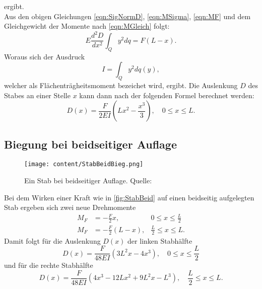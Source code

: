 ergibt. \\
Aus den obigen Gleichungen \eqref{eqn:SigNormD}, \eqref{eqn:MSigma}, \eqref{eqn:MF} und dem Gleichgewicht der Momente nach \eqref{eqn:MGleich} folgt:
\begin{equation}
    E\frac{d^2D}{dx^2} \int_Q y^2dq = F(L-x).
\end{equation}
Woraus sich der Ausdruck
\begin{equation}
    I = \int_Q y^2dq(y),
\end{equation}
welcher als Flächenträgheitsmoment bezeichet wird, ergibt.
Die Auslenkung $D$ des Stabes an einer Stelle $x$ kann dann nach der folgenden Formel berechnet werden:
\begin{equation}
    \label{eqn:DvonX}
    D\left(x\right) = \frac{F}{2EI}\left(Lx^2-\frac{x^3}{3}\right),\quad 0\leq x \leq L.
\end{equation}
\subsection{Biegung bei beidseitiger Auflage}
\label{subsec:BeidseitigeAuflage}
\begin{figure}[H]
    \centering
    \texttt{[image: content/StabBeidBieg.png]}
    \caption{Ein Stab bei beidseitiger Auflage. Quelle: \cite{sample}}  %
    \label{fig:StabBeid}
\end{figure}
Bei dem Wirken einer Kraft wie in \autoref{fig:StabBeid} auf einen beidseitig aufgelegten Stab ergeben sich zwei neue Drehmomente
\begin{align}
    M_F &= -\frac{F}{2}x, &0 \leq x \leq \frac{L}{2}\\
    M_F &= -\frac{F}{2}(L-x), &\frac{L}{2} \leq x \leq L.
\end{align}
Damit folgt für die Auslenkung $D(x)$ der linken Stabhälfte
\begin{equation}
    D(x) = \frac{F}{48EI}\left(3L^2x-4x^3\right), \quad 0 \leq x \leq \frac{L}{2}
\end{equation}
und für die rechte Stabhälfte
\begin{equation}
    D(x) = \frac{F}{48EI}\left(4x^3 - 12Lx^2 + 9L^2x - L^3\right), \quad \frac{L}{2} \leq x \leq L.
\end{equation}


